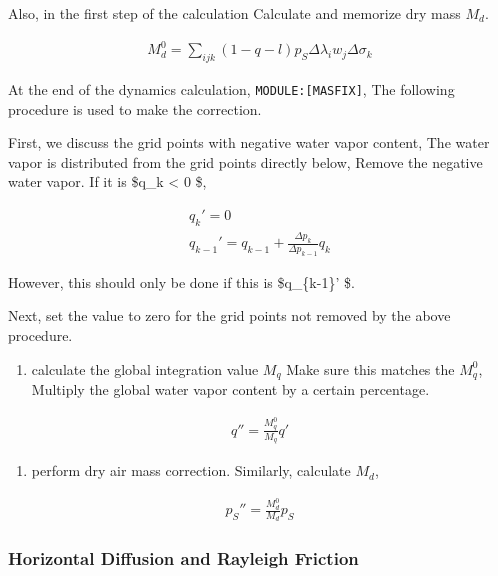 Also, in the first step of the calculation Calculate and memorize dry
mass \(M_d\).

\begin{eqnarray}
  M_d^0 = \sum_{ijk} (1-q-l) p_S \Delta\lambda_i w_j \Delta\sigma_k
\end{eqnarray}

At the end of the dynamics calculation, \texttt{MODULE:{[}MASFIX{]}},
The following procedure is used to make the correction.

First, we discuss the grid points with negative water vapor content, The
water vapor is distributed from the grid points directly below, Remove
the negative water vapor. If it is \$q\_k \textless{} 0 \$,

\begin{eqnarray}
        q_k'      =  0          \\
        q_{k-1}'  =  q_{k-1} + \frac{\Delta p_k}{\Delta p_{k-1}} q_k
\end{eqnarray}

However, this should only be done if this is \$q\_\{k-1\}'  \$.

Next, set the value to zero for the grid points not removed by the above
procedure.

\begin{enumerate}
\def\labelenumi{\arabic{enumi}.}
\setcounter{enumi}{2}
\tightlist
\item
  calculate the global integration value \(M_q\) Make sure this matches
  the \(M_q^0\), Multiply the global water vapor content by a certain
  percentage.
\end{enumerate}

\begin{eqnarray}
        q'' = \frac{M_q^0}{M_q} q'
\end{eqnarray}

\begin{enumerate}
\def\labelenumi{\arabic{enumi}.}
\setcounter{enumi}{3}
\tightlist
\item
  perform dry air mass correction. Similarly, calculate \(M_d\),
\end{enumerate}

\begin{eqnarray}
        p_S'' = \frac{M_d^0}{M_d} p_S
\end{eqnarray}

\hypertarget{horizontal-diffusion-and-rayleigh-friction}{%
\subsubsection{Horizontal Diffusion and Rayleigh
Friction}\label{horizontal-diffusion-and-rayleigh-friction}}


